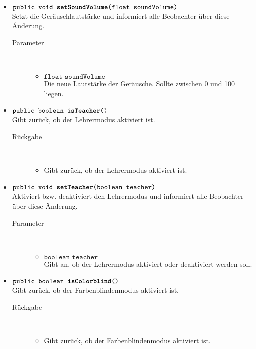 \begin{description}
\begin{itemize}
		\item $\texttt{public void \textbf{setSoundVolume}(float soundVolume)}$ \\ Setzt die Geräuschlautstärke und informiert alle Beobachter über diese Änderung.
		\begin{description}
			\item[Parameter] \hfill \\
			\vspace{-.8cm}
			\begin{itemize}
				\item $\texttt{float soundVolume}$ \\ Die neue Lautstärke der Geräusche. Sollte zwischen 0 und 100 liegen.
			\end{itemize}
		\end{description}
		
		\item $\texttt{public boolean \textbf{isTeacher}()}$ \\ Gibt zurück, ob der Lehrermodus aktiviert ist.
		\begin{description}
			\item[Rückgabe] \hfill \\
			\vspace{-.8cm}
			\begin{itemize}
				\item Gibt zurück, ob der Lehrermodus aktiviert ist.
			\end{itemize}
		\end{description}
		
		\item $\texttt{public void \textbf{setTeacher}(boolean teacher)}$ \\ Aktiviert bzw. deaktiviert den Lehrermodus und informiert alle Beobachter über diese Änderung.
		\begin{description}
			\item[Parameter] \hfill \\
			\vspace{-.8cm}
			\begin{itemize}
				\item $\texttt{boolean teacher}$ \\ Gibt an, ob der Lehrermodus aktiviert oder deaktiviert werden soll.
			\end{itemize}
		\end{description}
		
		\item $\texttt{public boolean \textbf{isColorblind}()}$ \\ Gibt zurück, ob der Farbenblindenmodus aktiviert ist.
		\begin{description}
			\item[Rückgabe] \hfill \\
			\vspace{-.8cm}
			\begin{itemize}
				\item Gibt zurück, ob der Farbenblindenmodus aktiviert ist.
			\end{itemize}
		\end{description}
		

\end{itemize}
\end{description}
